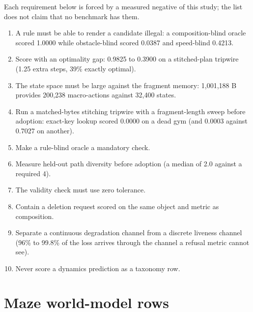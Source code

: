\documentclass{article} %
\begin{document}
Each requirement below is forced by a measured negative of this study; the list does not
claim that no benchmark has them. %
\begin{enumerate}
\item A rule must be able to render a candidate illegal: a composition-blind oracle scored 1.0000
  while obstacle-blind scored 0.0387 and speed-blind 0.4213. %
\item Score with an optimality gap: 0.9825 to 0.3900 on a stitched-plan tripwire (1.25 extra steps,
  39\% exactly optimal). %
\item The state space must be large against the fragment memory: 1,001,188 B provides 200,238
  macro-actions against 32,400 states. %
\item Run a matched-bytes stitching tripwire with a fragment-length sweep before adoption: exact-key
  lookup scored 0.0000 on a dead gym (and 0.0003 against 0.7027 on another).
\item Make a rule-blind oracle a mandatory check.
\item Measure held-out path diversity before adoption (a median of 2.0 against a required 4).
\item The validity check must use zero tolerance.
\item Contain a deletion request scored on the same object and metric as composition.
\item Separate a continuous degradation channel from a discrete liveness channel (96\% to 99.8\% of
  the loss arrives through the channel a refusal metric cannot see). %
\item Never score a dynamics prediction as a taxonomy row.
\end{enumerate}

\section{Maze world-model rows}
\label{app:mazewm}
\end{document}
